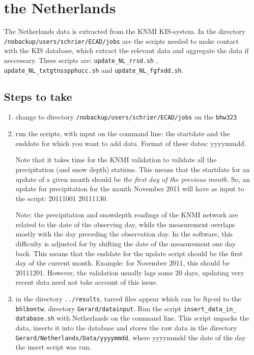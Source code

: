 \documentclass[a4paper]{article}
\begin{document}

\section{the Netherlands}

The Netherlands data is extracted from the KNMI KIS-system. In the directory
\texttt{/nobackup/users/schrier/ECAD/jobs} are the scripts needed to make contact
with the KIS database, which extract the relevant data and aggregate the data
if neccessary. These scripts are: \texttt{update\_NL\_rrsd.sh} , \texttt{update\_NL\_txtgtnsspphucc.sh}
and \texttt{update\_NL\_fgfxdd.sh}.

\subsection*{Steps to take}

\begin{enumerate}
\item change to directory \texttt{/nobackup/users/schrier/ECAD/jobs} on the \texttt{bhw323}
\item run the scripts, with input on the command line: the startdate and the enddate for which
you want to add data. Format of these dates: yyyymmdd. 

Note that it takes time for the KNMI
validation to validate all the precipitation (and snow depth) stations. This means that the startdate for
an update of a given month should be \emph{the first day of the previous month}. So, an update
for precipitation for the month November 2011 will have as input to the script: 20111001 20111130.

Note: the precipitation and snowdepth readings of the KNMI network are related to the date of the observing
day, while the measurement overlaps mostly with the day preceding the observation day. In the software,
this difficulty is adjusted for by shifting the date of the measurement one day back. This means
that the enddate for the update script should be the first day of the current month. Example: for November 2011,
this should be 20111201. However, the validation usually lags some 20 days, updating very recent data
need not take account of this issue.
\item in the directory \texttt{../results}, tarred files appear which can be ftp-ed to the \texttt{bhlbontw},
directory \texttt{Gerard/datainput}. Run the script \texttt{insert\_data\_in\_} \texttt{database.sh} 
with Netherlands
on the command line. This script unpacks the data, inserts it into the database and stores the raw
data in the directory \texttt{Gerard/Netherlands/Data/yyyymmdd}, where yyyymmdd the date of the day the insert
script was run.
\end{enumerate}
\end{document}
